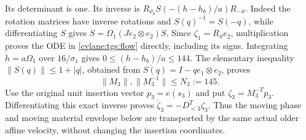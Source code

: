 Its determinant is one. Its inverse is
$R_{\vartheta_b}S(-(h-h_b)/a)R_{-\vartheta}$.
Indeed the rotation matrices have inverse rotations and
$S(q)^{-1}=S(-q)$, while differentiating $S$ gives
$\dot S=\Omega_1(J e_2\otimes e_2)S$.
Since $\zeta_1=R_\vartheta e_2$, multiplication proves the ODE
in \eqref{cvlane:tgs:flow} directly, including its signs.
Integrating $\dot h=a\Omega_1$ over $16/\sigma_1$ gives
$0\leq(h-h_b)/a\leq144$. The elementary inequality
$\|S(q)\|\leq1+|q|$, obtained from
$S(q)=I-qe_1\otimes e_2$, proves
\begin{equation}\label{cvlane:tgs:matrixbounds}
 \|M_3\|,\|M_3^{-1}\|\leq N_3:=145.
\end{equation}
Use the original unit insertion vector $p_3=e(s_3)$ and put
$\zeta_3=M_3^{-T}p_3$. Differentiating this exact inverse proves
$\dot\zeta_3=-D_{<3}^T\zeta_3$. Thus the moving phase and
moving material envelope below are transported by the same actual
older affine velocity, without changing the insertion coordinates.

